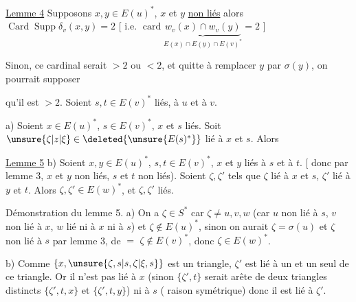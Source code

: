 \uline{Lemme 4}  Supposons $x,y\in E(u)^*$, $x$ et $y$ \uline{non liés} alors $\operatorname{Card}\operatorname{Supp}\delta_v(x,y)=2$ [ i.e. $\operatorname{card}\underbrace{w_v(x)\cap w_v(y)}_{E(x)\cap E(y)\cap E(v)^*}=2$ ]

Sinon, ce cardinal serait $>2$ ou $<2$, et quitte à remplacer $y$ par $\sigma(y)$, on pourrait supposer

qu'il est $>2$. Soient  $s,t\in E(v)^*$ liés,  à $u$ et à $v$.

a) Soient $x\in E(u)^*$, $s\in E(v)^*$, $x$ et $s$ liés. Soit $\unsure{\zeta|z|\xi}\in\deleted{\unsure{E(s)^*}}$ lié à $x$ et $s$. Alors 

\uline{Lemme 5} b) Soient $x,y\in E(u)^*$, $s,t\in E(v)^*$, $x$ et $y$ liés  à $s$ et à $t$. [ donc par lemme 3, $x$ et $y$ non liés, $s$ et $t$ non liés).  Soient $\zeta,\zeta'$  tels que  $\zeta$ lié à $x$ et $s$, $\zeta'$ lié à $y$ et $t$. Alors $\zeta,\zeta'\in E(w)^*$, et $\zeta,\zeta'$ liés.

Démonstration du lemme 5.  a) On a $\zeta\in S^*$ car $\zeta\ne u,v,w$ (car $u$ non lié à $s$, $v$ non lié à $x$, $w$ lié ni à $x$ ni à $s$) et $\zeta\notin E(u)^*$, sinon on aurait $\zeta=\sigma(u)$ et $\zeta$ \deleted{\unsure{$\zeta$}} non lié à $s$ par lemme 3, de $=$ $\zeta\notin E(v)^*$, donc $\zeta\in E(w)^*$.

b) Comme $\{x,\unsure{\zeta,s|s,\zeta|\xi,s}\}$ est un triangle, $\zeta'$ est lié à un  et un seul de ce triangle. Or il n'est pas lié à $x$ (sinon $\{\zeta',t\}$ serait arête de deux triangles distincts $\{\zeta',t,x\}$ et $\{\zeta',t,y\}$) ni à $s$ ( raison symétrique) donc il est lié à $\zeta'$.


